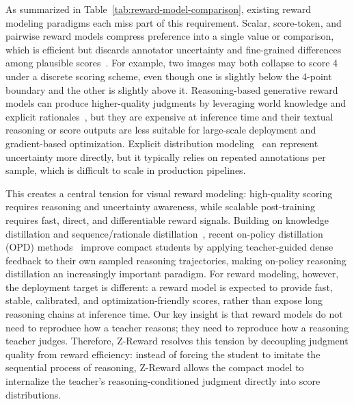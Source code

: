 \documentclass{article}
\newcommand{\mname}{Z-Reward\xspace}
\begin{document}
As summarized in Table~\ref{tab:reward-model-comparison}, existing reward modeling paradigms each miss part of this requirement. Scalar, score-token, and pairwise reward models compress preference into a single value or comparison, which is efficient but discards annotator uncertainty and fine-grained differences among plausible scores~\cite{uma2021learning,davani2022dealing}. For example, two images may both collapse to score 4 under a discrete scoring scheme, even though one is slightly below the 4-point boundary and the other is slightly above it. Reasoning-based generative reward models can produce higher-quality judgments by leveraging world knowledge and explicit rationales~\cite{zheng2023judging,gu2024surveyllmasajudge,chen2024mllmjudge,chen2024mjbench}, but they are expensive at inference time and their textual reasoning or score outputs are less suitable for large-scale deployment and gradient-based optimization. Explicit distribution modeling~\cite{talebi2018nima,diaz2019soft,wen2023ordinal,you2025teachinglargelanguagemodels} can represent uncertainty more directly, but it typically relies on repeated annotations per sample, which is difficult to scale in production pipelines.

This creates a central tension for visual reward modeling: high-quality scoring requires reasoning and uncertainty awareness, while scalable post-training requires fast, direct, and differentiable reward signals. Building on knowledge distillation and sequence/rationale distillation~\cite{hinton2015distilling,kim2016sequence,hsieh2023distilling,gu2024minillm}, recent on-policy distillation (OPD) methods~\cite{lu2025onpolicy, zhao2026selfdistilledreasoneronpolicyselfdistillation, fu2026revisitingonpolicydistillationempirical,song2026surveyonpolicydistillationlarge, li2026rethinkingonpolicydistillationlarge, cui2026briefoverviewonpolicyselfdistillation} improve compact students by applying teacher-guided dense feedback to their own sampled reasoning trajectories, making on-policy reasoning distillation an increasingly important paradigm. For reward modeling, however, the deployment target is different: a reward model is expected to provide fast, stable, calibrated, and optimization-friendly scores, rather than expose long reasoning chains at inference time. Our key insight is that reward models do not need to reproduce how a teacher reasons; they need to reproduce how a reasoning teacher judges. Therefore, \mname resolves this tension by decoupling judgment quality from reward efficiency: instead of forcing the student to imitate the sequential process of reasoning, \mname allows the compact model to internalize the teacher's reasoning-conditioned judgment directly into score distributions.
\end{document}
